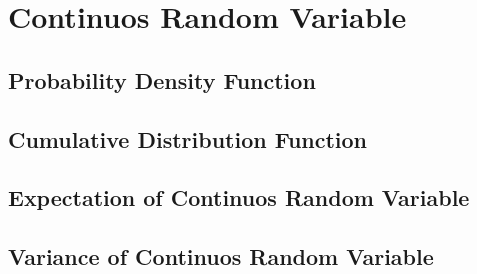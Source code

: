\chapter{Continuos Random Variable}
\label{chap:continuos-random-variable}

\begin{definition}
  \label{def:continuos-random-variable}
\end{definition}

\section{Probability Density Function}
\label{sec:probability-density-function-crv}

\section{Cumulative Distribution Function}
\label{sec:cumulative-distribution-function-crv}

\section{Expectation of Continuos Random Variable}
\label{sec:expectation-of-continuos-random-variable}

\section{Variance of Continuos Random Variable}
\label{sec:variance-of-continuos-random-variable}

